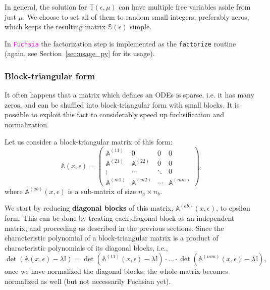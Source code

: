 \documentclass{elsarticle}
\newcommand{\eps}{\epsilon}
\newcommand{\fuchsia}{\textcolor{fuchsia}{\texttt{Fuchsia}}\xspace}
\newcommand{\code}[1]{\texttt{#1}}
\newcommand{\M}[1]{\mathbb{#1}} %
\begin{document}
In general, the solution for $\M T(\eps,\mu)$ can have multiple free variables aside from just $\mu$.
We choose to set all of them to random small integers, preferably zeros, which keeps the resulting matrix $\M S(\eps)$ simple.

In \fuchsia the factorization step is implemented as the \code{factorize} routine (again, see Section~\ref{sec:usage_py} for its usage).

\subsubsection{Block-triangular form}
\label{sec:blockreduce}

It often happens that a matrix which defines an ODEs is sparse, i.e. it has many zeros, and can be shuffled into block-triangular form with small blocks.
It is possible to exploit this fact to considerably speed up fuchsification and normalization.

Let us consider a block-triangular matrix of this form:
\begin{equation}
\label{eq:bdiag}
\M A(x,\eps)=
\left(
\begin{matrix}
  \M A^{(11)} & 0 & 0 & 0
\\
  \M A^{(21)} & \M A^{(22)} & 0 & 0
\\
  \vdots & \cdots & \ddots & 0
\\
  \M A^{(m1)} & \M A^{(m2)} & \cdots & \M A^{(mm)}
\end{matrix}
\right),
\end{equation}
where $\M A^{(ab)}(x,\eps)$ is a sub-matrix of size $n_a \times n_b$.

We start by reducing {\bf diagonal blocks} of this matrix, $\M A^{(ab)}(x,\eps)$, to epsilon form.
This can be done by treating each diagonal block as an independent matrix, and proceeding as described in the previous sections.
Since the characteristic polynomial of a block-triangular matrix is a product of characteristic polynomials of its diagonal blocks, i.e.,
\begin{equation}
  \det(\M A(x,\eps)-\lambda \M I) =
    \det(\M A^{(11)}(x,\eps) - \lambda\M I) \cdot \ldots \cdot
    \det(\M A^{(mm)}(x,\eps) - \lambda \M I),
\end{equation}
once we have normalized the diagonal blocks, the whole matrix becomes normalized as well (but not necessarily Fuchsian yet).
\end{document}
